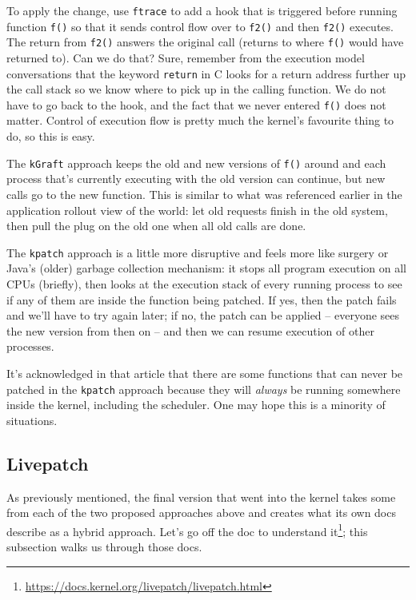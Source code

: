 To apply the change, use \texttt{ftrace} to add a hook that is triggered before running function \texttt{f()} so that it sends control flow over to \texttt{f2()} and then \texttt{f2()} executes. The return from \texttt{f2()} answers the original call (returns to where \texttt{f()} would have returned to). Can we do that? Sure, remember from the execution model conversations that the keyword \texttt{return} in C looks for a return address further up the call stack so we know where to pick up in the calling function. We do not have to go back to the hook, and the fact that we never entered \texttt{f()} does not matter. Control of execution flow is pretty much the kernel's favourite thing to do, so this is easy.

The \texttt{kGraft} approach keeps the old and new versions of \texttt{f()} around and each process that's currently executing with the old version can continue, but new calls go to the new function. This is similar to what was referenced earlier in the application rollout view of the world: let old requests finish in the old system, then pull the plug on the old one when all old calls are done.

The \texttt{kpatch} approach is a little more disruptive and feels more like surgery or Java's (older) garbage collection mechanism: it stops all program execution on all CPUs (briefly), then looks at the execution stack of every running process to see if any of them are inside the function being patched. If yes, then the patch fails and we'll have to try again later; if no, the patch can be applied -- everyone sees the new version from then on -- and then we can resume execution of other processes.

It's acknowledged in that article that there are some functions that can never be patched in the \texttt{kpatch} approach because they will \textit{always} be running somewhere inside the kernel, including the scheduler. One may hope this is a minority of situations.

\subsection*{Livepatch}
As previously mentioned, the final version that went into the kernel takes some from each of the two proposed approaches above and creates what its own docs describe as a hybrid approach. Let's go off the doc to understand it\footnote{ \url{https://docs.kernel.org/livepatch/livepatch.html} }; this subsection walks us through those docs.

